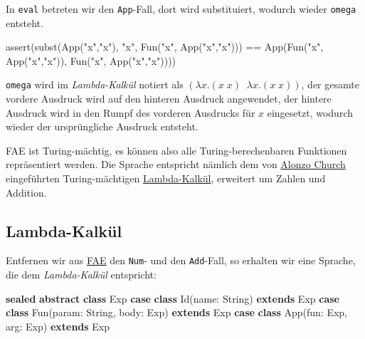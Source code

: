 \documentclass[]{article}
\newenvironment{Shaded}{}{}
\newcommand{\FunctionTok}[1]{\textcolor[rgb]{0.02,0.16,0.49}{#1}}
\newcommand{\KeywordTok}[1]{\textcolor[rgb]{0.00,0.44,0.13}{\textbf{#1}}}
\newcommand{\NormalTok}[1]{#1}
\newcommand{\StringTok}[1]{\textcolor[rgb]{0.25,0.44,0.63}{#1}}
\begin{document}
In \texttt{eval} betreten wir den \texttt{App}-Fall, dort wird
substituiert, wodurch wieder \texttt{omega} entsteht.

\begin{Shaded}
\begin{Highlighting}[]
\FunctionTok{assert}\NormalTok{(}\FunctionTok{subst}\NormalTok{(}\FunctionTok{App}\NormalTok{(}\StringTok{"x"}\NormalTok{,}\StringTok{"x"}\NormalTok{), }\StringTok{"x"}\NormalTok{, }\FunctionTok{Fun}\NormalTok{(}\StringTok{"x"}\NormalTok{, }\FunctionTok{App}\NormalTok{(}\StringTok{"x"}\NormalTok{,}\StringTok{"x"}\NormalTok{))) ==}
\FunctionTok{App}\NormalTok{(}\FunctionTok{Fun}\NormalTok{(}\StringTok{"x"}\NormalTok{, }\FunctionTok{App}\NormalTok{(}\StringTok{"x"}\NormalTok{,}\StringTok{"x"}\NormalTok{)), }\FunctionTok{Fun}\NormalTok{(}\StringTok{"x"}\NormalTok{, }\FunctionTok{App}\NormalTok{(}\StringTok{"x"}\NormalTok{,}\StringTok{"x"}\NormalTok{))))}
\end{Highlighting}
\end{Shaded}

\texttt{omega} wird im \emph{Lambda-Kalkül} notiert als
\((\lambda x.(x \; x) \;\; \lambda x.(x \; x))\), der gesamte vordere
Ausdruck wird auf den hinteren Ausdruck angewendet, der hintere Ausdruck
wird in den Rumpf des vorderen Ausdrucks für \(x\) eingesetzt, wodurch
wieder der ursprüngliche Ausdruck entsteht.

FAE ist Turing-mächtig, es können also alle Turing-berechenbaren
Funktionen repräsentiert werden. Die Sprache entspricht nämlich dem von
\href{https://en.wikipedia.org/wiki/Alonzo_Church}{Alonzo Church}
eingeführten Turing-mächtigen
\href{https://en.wikipedia.org/wiki/Lambda_calculus}{Lambda-Kalkül},
erweitert um Zahlen und Addition.

\hypertarget{lambda-kalkuxfcl}{%
\subsection{Lambda-Kalkül}\label{lambda-kalkuxfcl}}

Entfernen wir aus \protect\hyperlink{higher-order-funktionen-fae}{FAE}
den \texttt{Num}- und den \texttt{Add}-Fall, so erhalten wir eine
Sprache, die dem \emph{Lambda-Kalkül} entspricht:

\begin{Shaded}
\begin{Highlighting}[]
\KeywordTok{sealed} \KeywordTok{abstract} \KeywordTok{class}\NormalTok{ Exp}
\KeywordTok{case} \KeywordTok{class} \FunctionTok{Id}\NormalTok{(name: String) }\KeywordTok{extends}\NormalTok{ Exp}
\KeywordTok{case} \KeywordTok{class} \FunctionTok{Fun}\NormalTok{(param: String, body: Exp) }\KeywordTok{extends}\NormalTok{ Exp}
\KeywordTok{case} \KeywordTok{class} \FunctionTok{App}\NormalTok{(fun: Exp, arg: Exp) }\KeywordTok{extends}\NormalTok{ Exp}
\end{Highlighting}
\end{Shaded}
\end{document}
